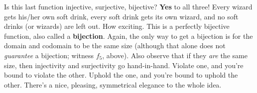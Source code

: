 Is this last function injective, surjective, bijective? \textbf{Yes} to all
three! Every wizard gets his/her own soft drink, every soft drink gets its
own wizard, and no soft drinks (or wizards) are left out. How exciting.
This is a perfectly bijective function, also called a \textbf{bijection}.
Again, the only way to get a bijection is for the domain and codomain to be
the same size (although that alone does not \textit{guarantee} a bijection;
witness $f_5$, above). Also observe that if they \textit{are} the same
size, then injectivity and surjectivity go hand-in-hand. Violate one, and
you're bound to violate the other. Uphold the one, and you're bound to
uphold the other. There's a nice, pleasing, symmetrical elegance to the
whole idea.

